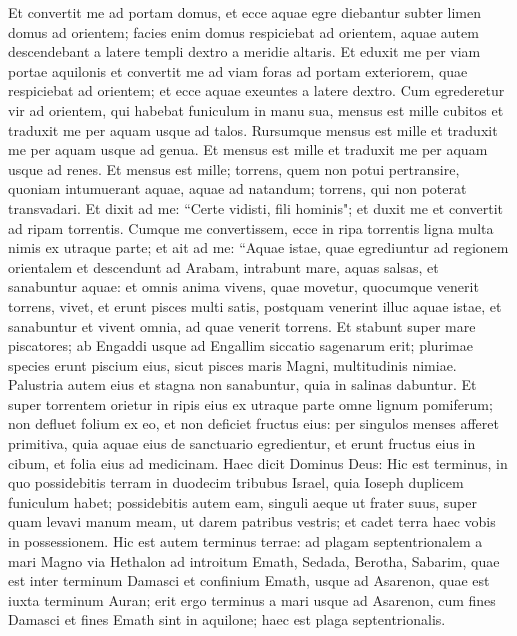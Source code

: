 \begin{biblechapter}  
\verse Et convertit me ad portam domus, et ecce aquae egre diebantur subter limen domus ad orientem; facies enim domus respiciebat ad orientem, aquae autem descendebant a latere templi dextro a meridie altaris. 
\verse Et eduxit me per viam portae aquilonis et convertit me ad viam foras ad portam exteriorem, quae respiciebat ad orientem; et ecce aquae exeuntes a latere dextro. 
\verse Cum egrederetur vir ad orientem, qui habebat funiculum in manu sua, mensus est mille cubitos et traduxit me per aquam usque ad talos. 
\verse Rursumque mensus est mille et traduxit me per aquam usque ad genua. 
\verse Et mensus est mille et traduxit me per aquam usque ad renes. Et mensus est mille; torrens, quem non potui pertransire, quoniam intumuerant aquae, aquae ad natandum; torrens, qui non poterat transvadari. 
\verse Et dixit ad me: “Certe vidisti, fili hominis"; et duxit me et convertit ad ripam torrentis. 
\verse Cumque me convertissem, ecce in ripa torrentis ligna multa nimis ex utraque parte; 
\verse et ait ad me: “Aquae istae, quae egrediuntur ad regionem orientalem et descendunt ad Arabam, intrabunt mare, aquas salsas, et sanabuntur aquae: 
\verse et omnis anima vivens, quae movetur, quocumque venerit torrens, vivet, et erunt pisces multi satis, postquam venerint illuc aquae istae, et sanabuntur et vivent omnia, ad quae venerit torrens. 
\verse Et stabunt super mare piscatores; ab Engaddi usque ad Engallim siccatio sagenarum erit; plurimae species erunt piscium eius, sicut pisces maris Magni, multitudinis nimiae. 
\verse Palustria autem eius et stagna non sanabuntur, quia in salinas dabuntur. 
\verse Et super torrentem orietur in ripis eius ex utraque parte omne lignum pomiferum; non defluet folium ex eo, et non deficiet fructus eius: per singulos menses afferet primitiva, quia aquae eius de sanctuario egredientur, et erunt fructus eius in cibum, et folia eius ad medicinam. 
\verse Haec dicit Dominus Deus: Hic est terminus, in quo possidebitis terram in duodecim tribubus Israel, quia Ioseph duplicem funiculum habet; 
\verse possidebitis autem eam, singuli aeque ut frater suus, super quam levavi manum meam, ut darem patribus vestris; et cadet terra haec vobis in possessionem.  
\verse Hic est autem terminus terrae: ad plagam septentrionalem a mari Magno via Hethalon ad introitum Emath, 
\verse Sedada, Berotha, Sabarim, quae est inter terminum Damasci et confinium Emath, usque ad Asarenon, quae est iuxta terminum Auran; 
\verse erit ergo terminus a mari usque ad Asarenon, cum fines Damasci et fines Emath sint in aquilone; haec est plaga septentrionalis. 

\end{biblechapter}
